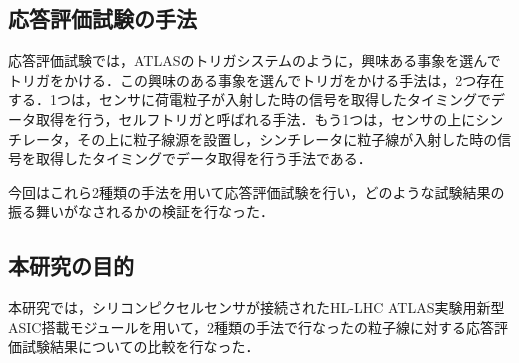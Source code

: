 \subsection{応答評価試験の手法}
応答評価試験では，ATLASのトリガシステムのように，興味ある事象を選んでトリガをかける．この興味のある事象を選んでトリガをかける手法は，2つ存在する．1つは，センサに荷電粒子が入射した時の信号を取得したタイミングでデータ取得を行う，セルフトリガと呼ばれる手法．もう1つは，センサの上にシンチレータ，その上に粒子線源を設置し，シンチレータに粒子線が入射した時の信号を取得したタイミングでデータ取得を行う手法である．\par
今回はこれら2種類の手法を用いて応答評価試験を行い，どのような試験結果の振る舞いがなされるかの検証を行なった．\par

\subsection{本研究の目的}
本研究では，シリコンピクセルセンサが接続されたHL-LHC ATLAS実験用新型ASIC搭載モジュールを用いて，2種類の手法で行なったの粒子線に対する応答評価試験結果についての比較を行なった．
